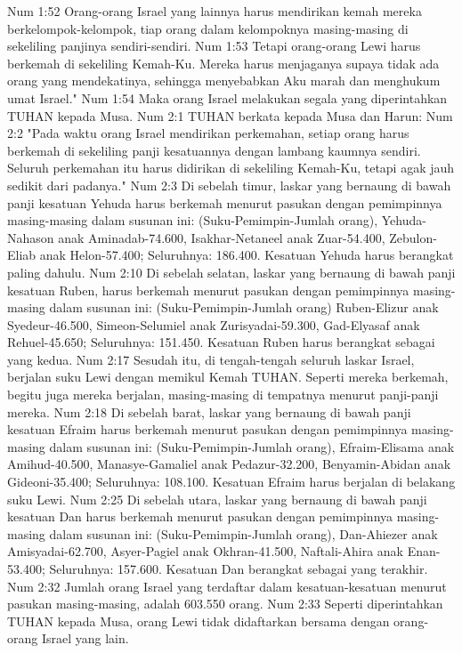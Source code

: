 Num 1:52  Orang-orang Israel yang lainnya harus mendirikan kemah mereka berkelompok-kelompok, tiap orang dalam kelompoknya masing-masing di sekeliling panjinya sendiri-sendiri.
Num 1:53  Tetapi orang-orang Lewi harus berkemah di sekeliling Kemah-Ku. Mereka harus menjaganya supaya tidak ada orang yang mendekatinya, sehingga menyebabkan Aku marah dan menghukum umat Israel."
Num 1:54  Maka orang Israel melakukan segala yang diperintahkan TUHAN kepada Musa.
Num 2:1  TUHAN berkata kepada Musa dan Harun:
Num 2:2  "Pada waktu orang Israel mendirikan perkemahan, setiap orang harus berkemah di sekeliling panji kesatuannya dengan lambang kaumnya sendiri. Seluruh perkemahan itu harus didirikan di sekeliling Kemah-Ku, tetapi agak jauh sedikit dari padanya."
Num 2:3  Di sebelah timur, laskar yang bernaung di bawah panji kesatuan Yehuda harus berkemah menurut pasukan dengan pemimpinnya masing-masing dalam susunan ini: (Suku-Pemimpin-Jumlah orang), Yehuda-Nahason anak Aminadab-74.600, Isakhar-Netaneel anak Zuar-54.400, Zebulon-Eliab anak Helon-57.400; Seluruhnya: 186.400. Kesatuan Yehuda harus berangkat paling dahulu.
Num 2:10  Di sebelah selatan, laskar yang bernaung di bawah panji kesatuan Ruben, harus berkemah menurut pasukan dengan pemimpinnya masing-masing dalam susunan ini: (Suku-Pemimpin-Jumlah orang) Ruben-Elizur anak Syedeur-46.500, Simeon-Selumiel anak Zurisyadai-59.300, Gad-Elyasaf anak Rehuel-45.650; Seluruhnya: 151.450. Kesatuan Ruben harus berangkat sebagai yang kedua.
Num 2:17  Sesudah itu, di tengah-tengah seluruh laskar Israel, berjalan suku Lewi dengan memikul Kemah TUHAN. Seperti mereka berkemah, begitu juga mereka berjalan, masing-masing di tempatnya menurut panji-panji mereka.
Num 2:18  Di sebelah barat, laskar yang bernaung di bawah panji kesatuan Efraim harus berkemah menurut pasukan dengan pemimpinnya masing-masing dalam susunan ini: (Suku-Pemimpin-Jumlah orang), Efraim-Elisama anak Amihud-40.500, Manasye-Gamaliel anak Pedazur-32.200, Benyamin-Abidan anak Gideoni-35.400; Seluruhnya: 108.100. Kesatuan Efraim harus berjalan di belakang suku Lewi.
Num 2:25  Di sebelah utara, laskar yang bernaung di bawah panji kesatuan Dan harus berkemah menurut pasukan dengan pemimpinnya masing-masing dalam susunan ini: (Suku-Pemimpin-Jumlah orang), Dan-Ahiezer anak Amisyadai-62.700, Asyer-Pagiel anak Okhran-41.500, Naftali-Ahira anak Enan-53.400; Seluruhnya: 157.600. Kesatuan Dan berangkat sebagai yang terakhir.
Num 2:32  Jumlah orang Israel yang terdaftar dalam kesatuan-kesatuan menurut pasukan masing-masing, adalah 603.550 orang.
Num 2:33  Seperti diperintahkan TUHAN kepada Musa, orang Lewi tidak didaftarkan bersama dengan orang-orang Israel yang lain.
